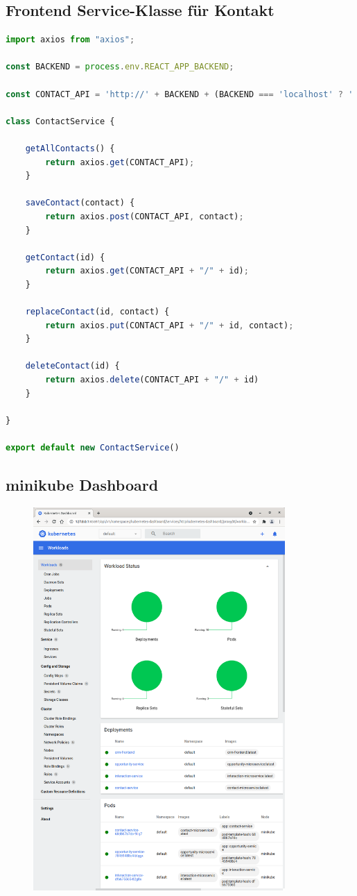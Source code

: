 \subsection*{Frontend Service-Klasse für Kontakt}
\begin{lstlisting}[language=JavaScript]
import axios from "axios";

const BACKEND = process.env.REACT_APP_BACKEND;

const CONTACT_API = 'http://' + BACKEND + (BACKEND === 'localhost' ? ':8080' : ':30010') + '/contacts';

class ContactService {

    getAllContacts() {
        return axios.get(CONTACT_API);
    }

    saveContact(contact) {
        return axios.post(CONTACT_API, contact);
    }

    getContact(id) {
        return axios.get(CONTACT_API + "/" + id);
    }

    replaceContact(id, contact) {
        return axios.put(CONTACT_API + "/" + id, contact);
    }

    deleteContact(id) {
        return axios.delete(CONTACT_API + "/" + id)
    }

}

export default new ContactService()
\end{lstlisting}

\clearpage
\subsection*{minikube Dashboard}

\begin{figure}[H] 
    \centering
    \includegraphics[width=0.855\textwidth]{figures/MinikubeDashboard.png}
\end{figure}